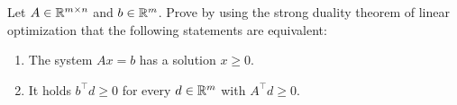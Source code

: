 \begin{solution}
    
\end{solution}

\begin{problem}
    Let \(A \in \mathbb{R}^{m \times n}\) and \(b \in \mathbb{R}^m\). Prove by using the strong duality theorem of linear optimization that the following statements are equivalent:

    \begin{enumerate}
        \item The system \(A x = b\) has a solution \(x \ge 0\).
        \item It holds \(b^\top d \ge 0\) for every \(d \in \mathbb{R}^m\) with \(A^\top d \ge 0\).
    \end{enumerate}
\end{problem}

\begin{solution}
    
\end{solution}
